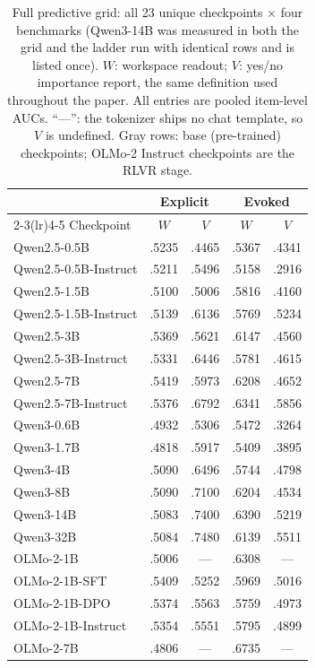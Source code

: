 \begin{table}[h]
\centering
\caption{Full predictive grid: all 23 unique checkpoints $\times$ four benchmarks (Qwen3-14B was measured in both the grid and the ladder run with identical rows and is listed once). $W$: workspace readout; $V$: yes/no importance report, the same definition used throughout the paper. All entries are pooled item-level AUCs. ``---'': the tokenizer ships no chat template, so $V$ is undefined. Gray rows: base (pre-trained) checkpoints; OLMo-2 Instruct checkpoints are the RLVR stage.}
\label{tab:appA1}
\scriptsize
\setlength{\tabcolsep}{4pt}
\begin{tabular}{l*{4}{c}}
\toprule
 & \multicolumn{2}{c}{Explicit} & \multicolumn{2}{c}{Evoked} \\
\cmidrule(lr){2-3}\cmidrule(lr){4-5}
Checkpoint & $W$ & $V$ & $W$ & $V$ \\
\midrule
{} Qwen2.5-0.5B & .5235 & .4465 & .5367 & .4341 \\
Qwen2.5-0.5B-Instruct & .5211 & .5496 & .5158 & .2916 \\
 Qwen2.5-1.5B & .5100 & .5006 & .5816 & .4160 \\
Qwen2.5-1.5B-Instruct & .5139 & .6136 & .5769 & .5234 \\
 Qwen2.5-3B & .5369 & .5621 & .6147 & .4560 \\
Qwen2.5-3B-Instruct & .5331 & .6446 & .5781 & .4615 \\
 Qwen2.5-7B & .5419 & .5973 & .6208 & .4652 \\
Qwen2.5-7B-Instruct & .5376 & .6792 & .6341 & .5856 \\
\addlinespace
Qwen3-0.6B & .4932 & .5306 & .5472 & .3264 \\
Qwen3-1.7B & .4818 & .5917 & .5409 & .3895 \\
Qwen3-4B & .5090 & .6496 & .5744 & .4798 \\
Qwen3-8B & .5090 & .7100 & .6204 & .4534 \\
Qwen3-14B & .5083 & .7400 & .6390 & .5219 \\
Qwen3-32B & .5084 & .7480 & .6139 & .5511 \\
\addlinespace
{} OLMo-2-1B & .5006 & --- & .6308 & --- \\
OLMo-2-1B-SFT & .5409 & .5252 & .5969 & .5016 \\
OLMo-2-1B-DPO & .5374 & .5563 & .5759 & .4973 \\
OLMo-2-1B-Instruct & .5354 & .5551 & .5795 & .4899 \\
 OLMo-2-7B & .4806 & --- & .6735 & --- \\

\end{tabular}
\end{table}
